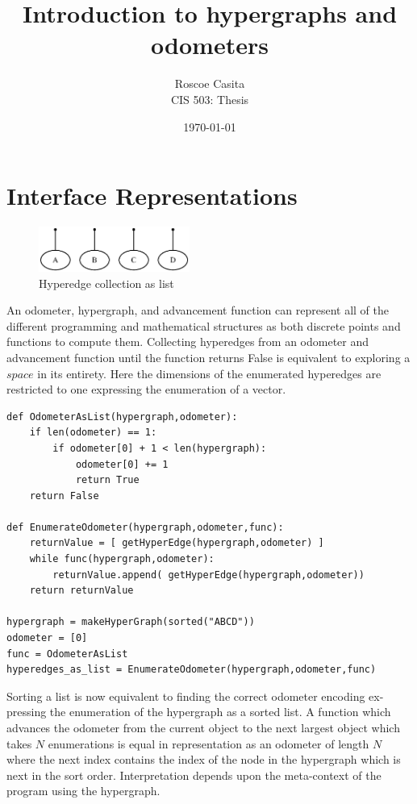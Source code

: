\documentclass[12pt]{article}
\title{Introduction to hypergraphs and odometers}
\author{
        Roscoe Casita \\
        CIS 503: Thesis\\
}
\date{\today}
\begin{document}
\section{Interface Representations}

\begin{figure}
\centering
\includegraphics[width=0.44\textwidth]{List.eps}
\caption{\label{fig:frog1}Hyperedge collection as list}
\end{figure}

An odometer, hypergraph, and advancement function can represent all of the different programming and mathematical structures as both discrete points and functions to compute them. Collecting hyperedges from an odometer and advancement function until the function returns False is equivalent to exploring a $space$ in its entirety. Here the dimensions of the enumerated hyperedges are restricted to one expressing the enumeration of a vector.

\begin{lstlisting}
def OdometerAsList(hypergraph,odometer):
    if len(odometer) == 1:
        if odometer[0] + 1 < len(hypergraph):
            odometer[0] += 1
            return True
    return False

def EnumerateOdometer(hypergraph,odometer,func):
    returnValue = [ getHyperEdge(hypergraph,odometer) ]
    while func(hypergraph,odometer):
        returnValue.append( getHyperEdge(hypergraph,odometer))
    return returnValue

hypergraph = makeHyperGraph(sorted("ABCD"))
odometer = [0]
func = OdometerAsList
hyperedges_as_list = EnumerateOdometer(hypergraph,odometer,func)
\end{lstlisting}

Sorting a list is now equivalent to finding the correct odometer encoding ex- pressing the enumeration of the hypergraph as a sorted list. A function which advances the odometer from the current object to the next largest object which takes $N$ enumerations is equal in representation as an odometer of length $N$ where the next index contains the index of the node in the hypergraph which is next in the sort order. Interpretation depends upon the meta-context of the program using the hypergraph.
\newpage
\end{document}
